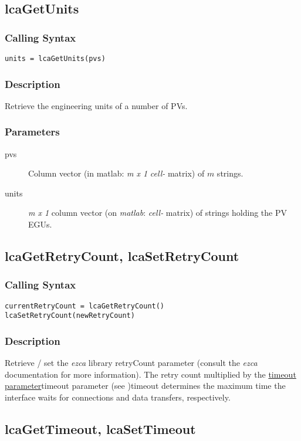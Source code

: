 \documentclass{article}
\newcommand{\matlab}{\ita{matlab}}
\newcommand{\ezca}{\ita{ezca}}
\newcommand{\pbrk}{\pagebreak[3]}
\newcommand{\ita}[1]{\emph{#1}}
\newcommand{\m}{$m$}
\newcommand{\mhack}{$m$} %
\newcommand{\mxl}{$m\times 1$}
\renewcommand{\m}{\ita{m}}
\newcommand{\mhack}{\ita{m}} %
\renewcommand{\mxl}{\ita{m x 1}}
\renewcommand{\pbrk}{}
\newcommand{\PVITEM}{
\item[pvs] Column vector (in matlab: \mxl{} \ita{cell-} matrix)
of \mhack{} strings.
}
\begin{document}
\pbrk
\subsection{lcaGetUnits}
\subsubsection{Calling Syntax}
\begin{verbatim}
units = lcaGetUnits(pvs)
\end{verbatim}
\subsubsection{Description}
Retrieve the engineering units of a number of PVs.
\subsubsection{Parameters}
\begin{description}
\PVITEM
\item[units] \mxl{} column vector (on \matlab: \ita{cell-} matrix)
of strings holding the PV EGUs.
\end{description}

\pbrk
\subsection{lcaGetRetryCount, lcaSetRetryCount}
\label{retrycnt}
\subsubsection{Calling Syntax}
\begin{verbatim}
currentRetryCount = lcaGetRetryCount()
lcaSetRetryCount(newRetryCount)
\end{verbatim}
\subsubsection{Description}
Retrieve / set the \ezca{} library retryCount parameter (consult the \ezca{}
documentation for more information). The retry count multiplied by the
\hyperref[ref]{timeout parameter}{timeout parameter (see }{ )}{timeout}
determines the maximum time the interface waits for connections and data
transfers, respectively.

\pbrk
\subsection{lcaGetTimeout, lcaSetTimeout}
\label{timeout}
\end{document}
